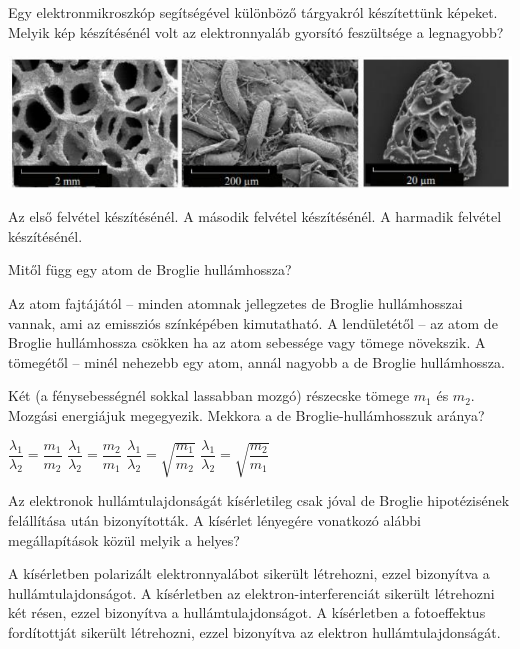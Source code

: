 \documentclass[addpoints,11pt,a4paper]{exam}
\begin{document}
\begin{questions}
		 \question Egy elektronmikroszkóp segítségével különböző tárgyakról készítettünk képeket.
		 Melyik kép készítésénél volt az elektronnyaláb gyorsító feszültsége a legnagyobb?
		 \begin{center}
		 	\includegraphics[width=\textwidth]{abra02}
		 \end{center}
		\begin{choices}
			\choice Az első felvétel készítésénél.
			\choice A második felvétel készítésénél.
			\choice A harmadik felvétel készítésénél.
			
		\end{choices}		  
		
		\question Mitől függ egy atom de Broglie hullámhossza?
		\begin{choices}
			\choice Az atom fajtájától – minden atomnak jellegzetes de Broglie hullámhosszai vannak,
			ami az emissziós színképében kimutatható.
			\choice A lendületétől – az atom de Broglie hullámhossza csökken ha az atom sebessége
			vagy tömege növekszik.
			\choice A tömegétől – minél nehezebb egy atom, annál nagyobb a de Broglie
			hullámhossza.
		\end{choices}
		
		\question Két (a fénysebességnél sokkal lassabban mozgó) részecske tömege $m_1$ és $m_2$.
		Mozgási energiájuk megegyezik. Mekkora a de Broglie-hullámhosszuk aránya?\\
		\begin{oneparchoices}
			\choice $\dfrac{\lambda_{1}}{\lambda_{2}} = \dfrac{m_{1}}{m_{2}}$ 
			\choice $\dfrac{\lambda_{1}}{\lambda_{2}} = \dfrac{m_{2}}{m_{1}}$ 
			\choice $\dfrac{\lambda_{1}}{\lambda_{2}} = \sqrt{\dfrac{m_{1}}{m_{2}}}$ 
			\choice $\dfrac{\lambda_{1}}{\lambda_{2}} = \sqrt{\dfrac{m_{2}}{m_{1}}}$ 
		\end{oneparchoices}
		
		\question Az elektronok hullámtulajdonságát kísérletileg csak jóval de Broglie
		hipotézisének felállítása után bizonyították. A kísérlet lényegére vonatkozó alábbi
		megállapítások közül melyik a helyes?
		\begin{choices}
			\choice A kísérletben polarizált elektronnyalábot sikerült létrehozni, ezzel bizonyítva a
			hullámtulajdonságot.
			\choice A kísérletben az elektron-interferenciát sikerült létrehozni két résen, ezzel
			bizonyítva a hullámtulajdonságot.
			\choice A kísérletben a fotoeffektus fordítottját sikerült létrehozni, ezzel bizonyítva az
			elektron hullámtulajdonságát.
		\end{choices}
		

\end{questions}
\end{document}
